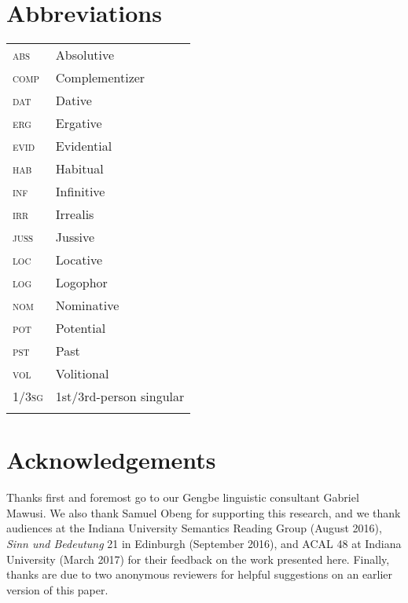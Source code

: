 \documentclass[output=paper,modfonts,nonflat]{langsci/langscibook}
\newcommand{\á}{\'{ã}}
\newcommand{\É}{\'{\~{ε}}}
\newcommand{\È}{\`{\~{ε}}}
\newcommand{\í}{\'{\~{i}}}
\newcommand{\ì}{\`{\~{i}}}
\newcommand{\Ó}{\'{\~{ɔ}}}
\newcommand{\Ò}{\`{\~{ɔ}}}
\newcommand{\ú}{\'{ũ}}
\newcommand{\ù}{\`{ũ}}
\begin{document}
\section*{Abbreviations}

\begin{tabularx}{.5\textwidth}{l l}
    \lsptoprule
    \textsc{abs} & Absolutive\\
    \textsc{comp} & Complementizer\\
    \textsc{dat} & Dative\\
    \textsc{erg} & Ergative\\
    \textsc{evid} & Evidential\\
    \textsc{hab} & Habitual\\
    \textsc{inf} & Infinitive\\
    \textsc{irr} & Irrealis\\
    \textsc{juss} & Jussive\\
    \textsc{loc} & Locative\\
    \textsc{log} & Logophor\\
    \textsc{nom} & Nominative\\
    \textsc{pot} & Potential\\
    \textsc{pst} & Past\\
    \textsc{vol} & Volitional\\
    1/3\textsc{sg} & 1st/3rd-person singular\\
    \lspbottomrule
\end{tabularx}

 
\section*{Acknowledgements}

Thanks first and foremost go to our Gengbe linguistic consultant Gabriel Mawusi. We also thank Samuel Obeng for supporting this research, and we thank audiences at the Indiana University Semantics Reading Group (August 2016), \emph{Sinn und Bedeutung} 21 in Edinburgh (September 2016), and ACAL 48 at Indiana University (March 2017) for their feedback on the work presented here. Finally, thanks are due to two anonymous reviewers for helpful suggestions on an earlier version of this paper.

\sloppy
\printbibliography[heading=subbibliography,notkeyword=this]
\end{document}
